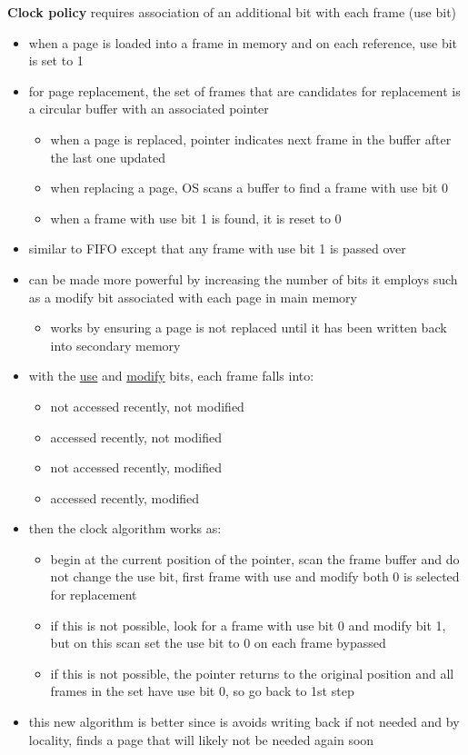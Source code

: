 \documentclass[11pt]{article}
\begin{document}
\textbf{Clock policy} requires association of an additional bit with each frame (use
bit)
\begin{itemize}
\item when a page is loaded into a frame in memory and on each reference,
use bit is set to 1
\item for page replacement, the set of frames that are candidates for replacement is a
circular buffer with an associated pointer
\begin{itemize}
\item when a page is replaced, pointer indicates next frame in the buffer after
the last one updated
\item when replacing a page, OS scans a buffer to find a frame with use bit 0
\item when a frame with use bit 1 is found, it is reset to 0
\end{itemize}
\item similar to FIFO except that any frame with use bit 1 is passed over
\item can be made more powerful by increasing the number of bits it employs such
as a modify bit associated with each page in main memory
\begin{itemize}
\item works by ensuring a page is not replaced until it has been written back
into secondary memory
\end{itemize}
\item with the \uline{use} and \uline{modify} bits, each frame falls into:
\begin{itemize}
\item not accessed recently, not modified
\item accessed recently, not modified
\item not accessed recently, modified
\item accessed recently, modified
\end{itemize}
\item then the clock algorithm works as:
\begin{itemize}
\item begin at the current position of the pointer, scan the frame buffer and do
not change the use bit, first frame with use and modify both 0 is selected
for replacement
\item if this is not possible, look for a frame with use bit 0 and modify bit 1,
but on this scan set the use bit to 0 on each frame bypassed
\item if this is not possible, the pointer returns to the original position and all
frames in the set have use bit 0, so go back to 1st step
\end{itemize}
\item this new algorithm is better since is avoids writing back if not needed
and by locality, finds a page that will likely not be needed again soon
\end{itemize}
\end{document}
